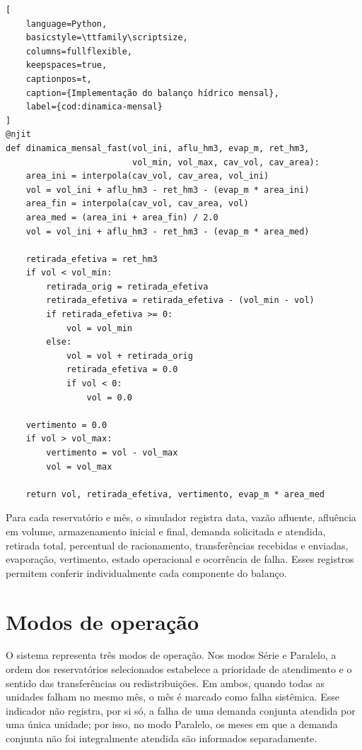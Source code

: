 \noindent\begin{minipage}{\linewidth}
\begin{lstlisting}[
    language=Python,
    basicstyle=\ttfamily\scriptsize,
    columns=fullflexible,
    keepspaces=true,
    captionpos=t,
    caption={Implementação do balanço hídrico mensal},
    label={cod:dinamica-mensal}
]
@njit
def dinamica_mensal_fast(vol_ini, aflu_hm3, evap_m, ret_hm3,
                         vol_min, vol_max, cav_vol, cav_area):
    area_ini = interpola(cav_vol, cav_area, vol_ini)
    vol = vol_ini + aflu_hm3 - ret_hm3 - (evap_m * area_ini)
    area_fin = interpola(cav_vol, cav_area, vol)
    area_med = (area_ini + area_fin) / 2.0
    vol = vol_ini + aflu_hm3 - ret_hm3 - (evap_m * area_med)

    retirada_efetiva = ret_hm3
    if vol < vol_min:
        retirada_orig = retirada_efetiva
        retirada_efetiva = retirada_efetiva - (vol_min - vol)
        if retirada_efetiva >= 0:
            vol = vol_min
        else:
            vol = vol + retirada_orig
            retirada_efetiva = 0.0
            if vol < 0:
                vol = 0.0

    vertimento = 0.0
    if vol > vol_max:
        vertimento = vol - vol_max
        vol = vol_max

    return vol, retirada_efetiva, vertimento, evap_m * area_med
\end{lstlisting}
\end{minipage}
\par\medskip

Para cada reservatório e mês, o simulador registra data, vazão afluente, afluência em volume, armazenamento inicial e final, demanda solicitada e atendida, retirada total, percentual de racionamento, transferências recebidas e enviadas, evaporação, vertimento, estado operacional e ocorrência de falha. Esses registros permitem conferir individualmente cada componente do balanço.

\section{Modos de operação}
\label{sec:modos-operacao}

O sistema representa três modos de operação. Nos modos Série e Paralelo, a ordem dos reservatórios selecionados estabelece a prioridade de atendimento e o sentido das transferências ou redistribuições. Em ambos, quando todas as unidades falham no mesmo mês, o mês é marcado como falha sistêmica. Esse indicador não registra, por si só, a falha de uma demanda conjunta atendida por uma única unidade; por isso, no modo Paralelo, os meses em que a demanda conjunta não foi integralmente atendida são informados separadamente.


